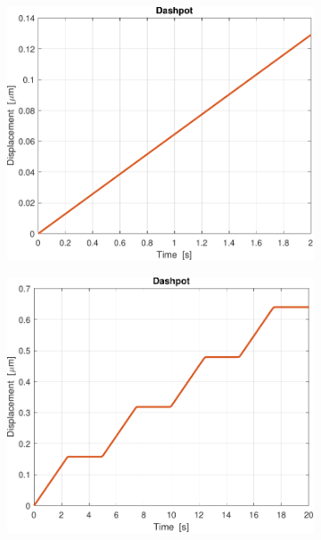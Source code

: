 \begin{figure}[t!]
	\begin{subfigure}{0.33\linewidth}
		\centering
			\includegraphics[width=0.95\linewidth]{../code/figs/step_dashpot_}
		\caption{}
	\end{subfigure}\hfill
	\begin{subfigure}{0.33\linewidth}
	\centering
		\includegraphics[width=0.95\linewidth]{../code/figs/square_dashpot_}
	\caption{}
\end{subfigure}\hfill
	\begin{subfigure}{0.33\linewidth}
	\centering

\end{subfigure}
\end{figure}
